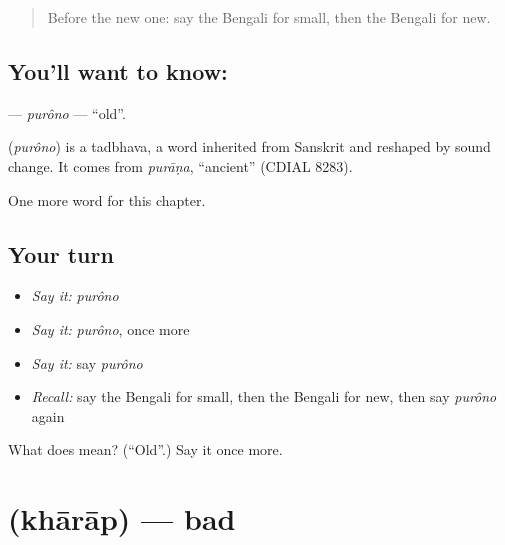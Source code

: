 \label{lesson:BN-C72-purono}



\begin{quote}
Before the new one: say the Bengali for small, then the Bengali for new.
\end{quote}

\subsection*{You'll want to know: }
\textbf{} — \emph{purôno} — \textquotedblleft{}old\textquotedblright{}.

\begin{cousinweb}
\textbf{} (\emph{purôno}) is a tadbhava, a word inherited from Sanskrit and reshaped by sound change. It comes from \emph{purāṇa}, \textquotedblleft{}ancient\textquotedblright{} (CDIAL 8283).
\end{cousinweb}

\begin{grammarlens}[title={What you've built}]
One more word for this chapter.
\end{grammarlens}

\subsection*{Your turn}
\begin{itemize}
\raggedright
  \item \emph{Say it:} \emph{purôno}
  \item \emph{Say it:} \emph{purôno}, once more
  \item \emph{Say it:} say \emph{purôno}
  \item \emph{Recall:} say the Bengali for small, then the Bengali for new, then say \emph{purôno} again
\end{itemize}

\begin{tcolorbox}[breakable,colback=teal!4,colframe=teal!35!black,title={Before you move on}]
What does  mean? (\textquotedblleft{}Old\textquotedblright{}.) Say it once more.
\end{tcolorbox}
\section[\texorpdfstring{\bn{খারাপ} (khārāp)}{খারাপ (khārāp)}]{ (khārāp) — bad}

\label{lesson:BN-C72-kharap}



